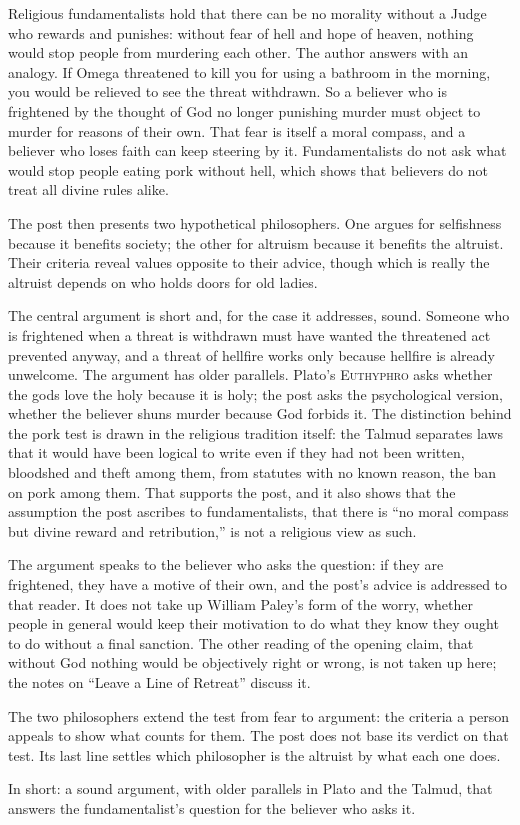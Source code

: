 \begin{afterword}
\summaryhead

Religious fundamentalists hold that there can be no morality without a Judge who rewards and punishes: without fear of hell and hope of heaven, nothing would stop people from murdering each other. The author answers with an analogy. If Omega threatened to kill you for using a bathroom in the morning, you would be relieved to see the threat withdrawn. So a believer who is frightened by the thought of God no longer punishing murder must object to murder for reasons of their own. That fear is itself a moral compass, and a believer who loses faith can keep steering by it. Fundamentalists do not ask what would stop people eating pork without hell, which shows that believers do not treat all divine rules alike.

The post then presents two hypothetical philosophers. One argues for selfishness because it benefits society; the other for altruism because it benefits the altruist. Their criteria reveal values opposite to their advice, though which is really the altruist depends on who holds doors for old ladies.

\responsehead

The central argument is short and, for the case it addresses, sound. Someone who is frightened when a threat is withdrawn must have wanted the threatened act prevented anyway, and a threat of hellfire works only because hellfire is already unwelcome. The argument has older parallels. Plato's \textsc{Euthyphro} asks whether the gods love the holy because it is holy; the post asks the psychological version, whether the believer shuns murder because God forbids it. The distinction behind the pork test is drawn in the religious tradition itself: the Talmud separates laws that it would have been logical to write even if they had not been written, bloodshed and theft among them, from statutes with no known reason, the ban on pork among them. That supports the post, and it also shows that the assumption the post ascribes to fundamentalists, that there is ``no moral compass but divine reward and retribution,'' is not a religious view as such.

The argument speaks to the believer who asks the question: if they are frightened, they have a motive of their own, and the post's advice is addressed to that reader. It does not take up William Paley's form of the worry, whether people in general would keep their motivation to do what they know they ought to do without a final sanction. The other reading of the opening claim, that without God nothing would be objectively right or wrong, is not taken up here; the notes on ``Leave a Line of Retreat'' discuss it.

The two philosophers extend the test from fear to argument: the criteria a person appeals to show what counts for them. The post does not base its verdict on that test. Its last line settles which philosopher is the altruist by what each one does.

In short: a sound argument, with older parallels in Plato and the Talmud, that answers the fundamentalist's question for the believer who asks it.
\end{afterword}
